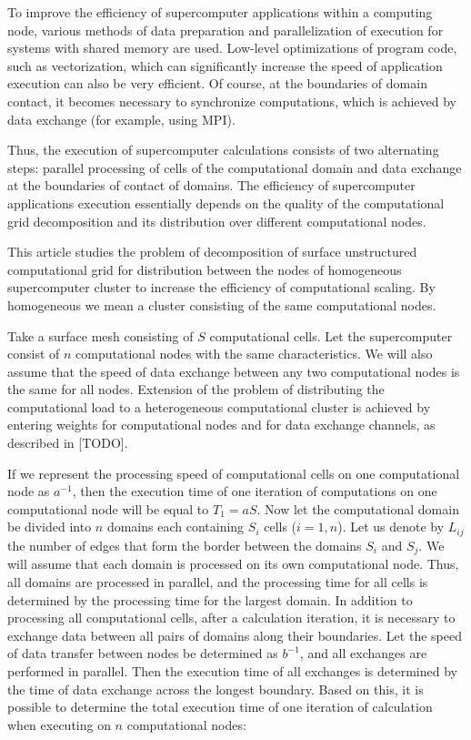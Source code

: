 \documentclass[
11pt,%
tightenlines,%
twoside,%
onecolumn,%
nofloats,%
nobibnotes,%
nofootinbib,%
superscriptaddress,%
noshowpacs,%
centertags]%
{revtex4}
\begin{document}
To improve the efficiency of supercomputer applications within a computing node, various methods of data preparation and parallelization of execution for systems with shared memory are used.
Low-level optimizations of program code, such as vectorization, which can significantly increase the speed of application execution can also be very efficient.
Of course, at the boundaries of domain contact, it becomes necessary to synchronize computations, which is achieved by data exchange (for example, using MPI).

Thus, the execution of supercomputer calculations consists of two alternating steps: parallel processing of cells of the computational domain and data exchange at the boundaries of contact of domains.
The efficiency of supercomputer applications execution essentially depends on the quality of the computational grid decomposition and its distribution over different computational nodes.

This article studies the problem of decomposition of surface unstructured computational grid for distribution between the nodes of homogeneous supercomputer cluster  to increase the efficiency of computational scaling.
By homogeneous we mean a cluster consisting of the same computational nodes.

Take a surface mesh consisting of $ S $ computational cells.
Let the supercomputer consist of $ n $ computational nodes with the same characteristics.
We will also assume that the speed of data exchange between any two computational nodes is the same for all nodes.
Extension of the problem of distributing the computational load to a heterogeneous computational cluster is achieved by entering weights for computational nodes and for data exchange channels, as described in [TODO].

If we represent the processing speed of computational cells on one computational node as $ a^{-1} $, then the execution time of one iteration of computations on one computational node will be equal to $ T_1 = aS $.
Now let the computational domain be divided into $ n $ domains each containing $ S_i $ cells ($ i = 1, n $).
Let us denote by $ L_{ij} $ the number of edges that form the border between the domains $ S_i $ and $ S_j $.
We will assume that each domain is processed on its own computational node.
Thus, all domains are processed in parallel, and the processing time for all cells is determined by the processing time for the largest domain.
In addition to processing all computational cells, after a calculation iteration, it is necessary to exchange data between all pairs of domains along their boundaries.
Let the speed of data transfer between nodes be determined as $ b^{-1} $, and all exchanges are performed in parallel.
Then the execution time of all exchanges is determined by the time of data exchange across the longest boundary.
Based on this, it is possible to determine the total execution time of one iteration of calculation when executing on $ n $ computational nodes:
\end{document}
